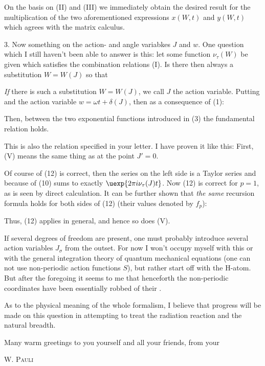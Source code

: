 On the basis on (II) and (III) we immediately obtain the desired result for the multiplication of the two aforementioned expressions $x(W, t)$ and $y(W, t)$
which agrees with the matrix calculus.

3. Now something on the action- and angle variabkes $J$ and $w$. One question which I still haven't been able to answer is this: let some function $\nu_\tau(W)$ be given which satisfies the combination relations (I). Is there then always a substitution $W = W(J)$ so that

\textit{If} there is such a substitution $W=W(J)$, we call $J$ the action variable. Putting
and the action variable $w = \omega t + \delta(J)$, then as a consequence of (1):

Then, between the two exponential functions introduced in (3) the fundamental relation
holds.

This is also the relation specified in your letter. I have proven it like this: First, (V) means the same thing as
at the point $J' = 0$.

Of course of (12) is correct, then the series on the left side is a Taylor series and because of (10) sums to exactly $\uexp{2\pi i\nu_\tau(J)t}$. Now (12) is correct for $p=1$, as is seen by direct calculation. It can be further shown that \textit{the same} recursion formula holds for both sides of (12) (their values denoted by $f_p$):

Thus, (12) applies in general, and hence so does (V).

If several degrees of freedom are present, one must probably introduce several action variables $J_\sigma$ from the outset. For now I won't occupy myself with this or with the general integration theory of quantum mechanical equations (one can not use non-periodic action functions $S$), but rather start off with the H-atom. But after the foregoing it seems to me that henceforth the non-periodic coordinates have been essentially robbed of their .

As to the physical meaning of the whole formalism, I believe that progress will be made on this question in attempting to treat the radiation reaction and the natural breadth.

Many warm greetings to you yourself and all your friends, from your

\textsc{W. Pauli}

